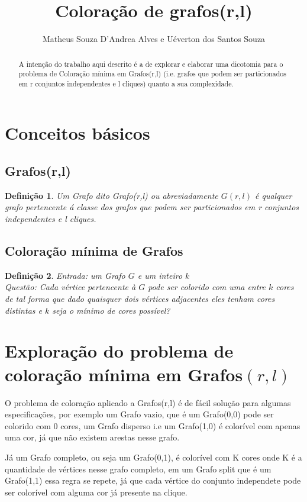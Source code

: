 \documentclass[a4paper,11pt]{article}
\title{Coloração de grafos(r,l)}
\author{Matheus Souza D'Andrea Alves e Uéverton dos Santos Souza}
\newtheorem{definição}{Definição}
\begin{document}
\maketitle

\begin{abstract}
    A intenção do trabalho aqui descrito é a de explorar e elaborar uma dicotomia para o problema de Coloração mínima em Grafos(r,l) (i.e. grafos que podem ser particionados em r conjuntos independentes e l cliques) quanto a sua complexidade. 
\end{abstract}


\tableofcontents

\section{Conceitos básicos}
    \subsection{Grafos(r,l)}
     \begin{definição}
         Um Grafo dito Grafo(r,l) ou abreviadamente $G(r,l)$ é qualquer grafo pertencente á classe dos grafos que podem ser particionados em r conjuntos independentes e l cliques.
     \end{definição}
    \subsection{Coloração mínima de Grafos}
     \begin{definição}
         Entrada: um Grafo $G$ e um inteiro $k$\\
  Questão: Cada vértice pertencente à $G$ pode ser colorido com uma entre $k$ cores
  de tal forma que dado quaisquer dois vértices adjacentes eles tenham cores distintas e $k$ seja o mínimo de cores possível?
     \end{definição}

\section{Exploração do problema de coloração mínima em Grafos$(r,l)$}
    O problema de coloração aplicado a Grafos(r,l) é de fácil solução para algumas especificações,
por exemplo um Grafo vazio, que é um Grafo(0,0) pode ser colorido com 0 cores, um Grafo disperso i.e um Grafo(1,0) é colorível com apenas uma cor, já que não existem arestas nesse grafo.

Já um Grafo completo, ou seja um Grafo(0,1), é colorível com K cores onde K é a quantidade de vértices nesse grafo completo, em um Grafo split que é um Grafo(1,1) essa regra se repete, já que cada vértice do conjunto independete pode ser colorível com alguma cor já presente na clique.
\end{document}
